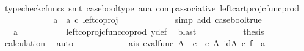 \begin{isabellebody}
\ \ \ \ \ \ \ \ \ \isamarkupfalse%
\ {\isacharparenleft}{\kern0pt}typecheck{\isacharunderscore}{\kern0pt}cfuncs{\isacharcomma}{\kern0pt}\ smt\ case{\isacharunderscore}{\kern0pt}bool{\isacharunderscore}{\kern0pt}type\ aua\ comp{\isacharunderscore}{\kern0pt}associative{}\ left{\isacharunderscore}{\kern0pt}cart{\isacharunderscore}{\kern0pt}proj{\isacharunderscore}{\kern0pt}cfunc{\isacharunderscore}{\kern0pt}prod{\isacharparenright}{\kern0pt}\isanewline
\ \ \ \ \ \ \ \isamarkupfalse%
\ \isamarkupfalse%
\ {\isachardoublequoteopen}{\isachardot}{\kern0pt}{\isachardot}{\kern0pt}{\isachardot}{\kern0pt}\ {\isacharequal}{\kern0pt}\ {\isacharparenleft}{\kern0pt}a{}\ {\isasymamalg}\ a{}{\isacharparenright}{\kern0pt}\ {\isasymcirc}\isactrlsub c\ left{\isacharunderscore}{\kern0pt}coproj\ {\isasymone}\ {\isasymone}{\isachardoublequoteclose}\isanewline
\ \ \ \ \ \ \ \ \ \isamarkupfalse%
\ {\isacharparenleft}{\kern0pt}simp\ add{\isacharcolon}{\kern0pt}\ case{\isacharunderscore}{\kern0pt}bool{\isacharunderscore}{\kern0pt}true{\isacharparenright}{\kern0pt}\isanewline
\ \ \ \ \ \ \ \isamarkupfalse%
\ \isamarkupfalse%
\ {\isachardoublequoteopen}{\isachardot}{\kern0pt}{\isachardot}{\kern0pt}{\isachardot}{\kern0pt}\ {\isacharequal}{\kern0pt}\ a{}{\isachardoublequoteclose}\isanewline
\ \ \ \ \ \ \ \ \ \isamarkupfalse%
\ left{\isacharunderscore}{\kern0pt}coproj{\isacharunderscore}{\kern0pt}cfunc{\isacharunderscore}{\kern0pt}coprod\ y{\isacharunderscore}{\kern0pt}def\ \isamarkupfalse%
\ blast\isanewline
\ \ \ \ \ \ \ \isamarkupfalse%
\ \isamarkupfalse%
\ {\isacharquery}{\kern0pt}thesis\ \isamarkupfalse%
\ calculation\ \isamarkupfalse%
\ auto\isanewline
\ \ \ \ \ \isamarkupfalse%
\isanewline
\ \ \ \ \ \isamarkupfalse%
\ a{}{\isacharunderscore}{\kern0pt}is{\isacharcolon}{\kern0pt}\ {\isachardoublequoteopen}{\isacharparenleft}{\kern0pt}eval{\isacharunderscore}{\kern0pt}func\ A\ {\isasymOmega}\ {\isasymcirc}\isactrlsub c\ {\isasymlangle}{\isasymf}\ {\isasymcirc}\isactrlsub c\ {\isasymbeta}\isactrlbsub A\isactrlbsup {\isasymOmega}\isactrlesup \isactrlesub {\isacharcomma}{\kern0pt}\ id{\isacharparenleft}{\kern0pt}A\isactrlbsup {\isasymOmega}\isactrlesup {\isacharparenright}{\kern0pt}{\isasymrangle}{\isacharparenright}{\kern0pt}\ {\isasymcirc}\isactrlsub c\ f\ {\isacharequal}{\kern0pt}\ a{}{\isachardoublequoteclose}\isanewline

\end{isabellebody}
